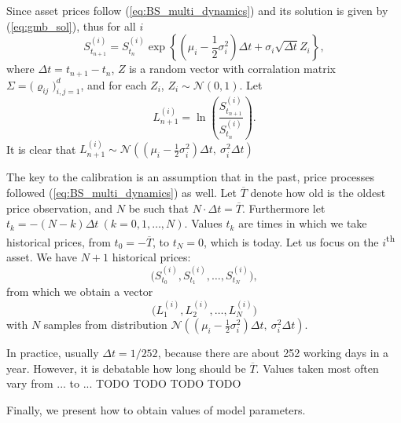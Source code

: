 \documentclass[a4paper,11pt, twoside]{book}
\theoremstyle{definition}
\theoremstyle{remark}
\begin{document}
Since asset prices follow (\ref{eq:BS_multi_dynamics}) and its solution is given by (\ref{eq:gmb_sol}), thus for all $i$
\[  S^{(i)}_{t_{n+1}} = S^{(i)}_{t_n} \exp\left\{ (\mu_i - \frac{1}{2}\sigma_i^2)\Delta t + \sigma_i \sqrt{\Delta t} Z_i \right\}, \]
where $\Delta t = t_{n+1} - t_n$, $Z$ is a random vector with corralation matrix $\Sigma = \bigl( \varrho_{ij} \bigr)_{i,j=1}^d$, and for each $Z_i$, $Z_i \sim \mathcal{N}(0,1)$. Let
\[  L^{(i)}_{n+1} = \ln\left( \frac{S^{(i)}_{t_{n+1}}}{S^{(i)}_{t_n}} \right). \]
It is clear that $ L^{(i)}_{n+1} \sim \mathcal{N}\left(  (\mu_i - \frac{1}{2}\sigma_i^2)\Delta t,\ \sigma_i^2 \Delta t \right)$

The key to the calibration is an assumption that in the past, price processes followed (\ref{eq:BS_multi_dynamics}) as well. Let $\overline{T}$ denote how old is the oldest price observation, and $N$ be such that $N \cdot \Delta t = \overline{T}$. Furthermore let $t_k = -(N-k)\Delta t\ (k=0,1,\ldots,N)$. Values $t_k$ are times in which we take historical prices, from $t_0 = -\overline{T}$, to $t_N = 0$, which is today. Let us focus on the $i$\textsuperscript{th} asset. We have $N+1$ historical prices:
\[  \bigl( S^{(i)}_{t_0}, S^{(i)}_{t_1}, \ldots,S^{(i)}_{t_N} \bigr), \]
from which we obtain a vector
\[ \bigl( L^{(i)}_{1}, L^{(i)}_{2}, \ldots, L^{(i)}_{N} \bigr) \]
with $N$ samples from distribution $\mathcal{N}\left(  (\mu_i - \frac{1}{2}\sigma_i^2)\Delta t,\ \sigma_i^2 \Delta t \right)$.

In practice, usually $\Delta t = 1/252$, because there are about 252 working days in a year. However, it is debatable how long should be $\overline{T}$. Values taken most often vary from ... to ...
{\Large \color{red} TODO TODO TODO TODO }

Finally, we present how to obtain values of model parameters.
\end{document}
